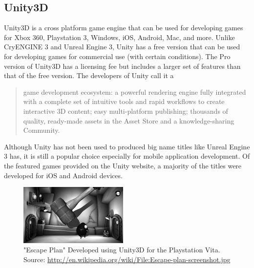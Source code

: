 \subsection{Unity3D}
Unity3D is a cross platform game engine that can be used for developing games for Xbox 360, Playstation 3, Windows, iOS, Android, Mac, and more. Unlike CryENGINE 3 and Unreal Engine 3, Unity has a free version that can be used for developing games for commercial use (with certain conditions). The Pro version of Unity3D has a licensing fee but includes a larger set of features than that of the free version. The developers of Unity call it a 
\begin{quote}
game development ecosystem: a powerful rendering engine fully integrated with a complete set of intuitive tools and rapid workflows to create interactive 3D content; easy multi-platform publishing; thousands of quality, ready-made assets in the Asset Store and a knowledge-sharing Community. \cite{unity3d}
\end{quote}
Although Unity has not been used to produced big name titles like Unreal Engine 3 has, it is still a popular choice especially for mobile application development. Of the featured games provided on the Unity website, a majority of the titles were developed for iOS and Android devices.
\begin{figure}[h!]
  \centering \includegraphics[width=0.48\textwidth]{Images/Escape-plan-screenshot.jpg}
	\caption{"Escape Plan" Developed using Unity3D for the Playstation Vita. Source: \url{http://en.wikipedia.org/wiki/File:Escape-plan-screenshot.jpg}}
\end{figure}

